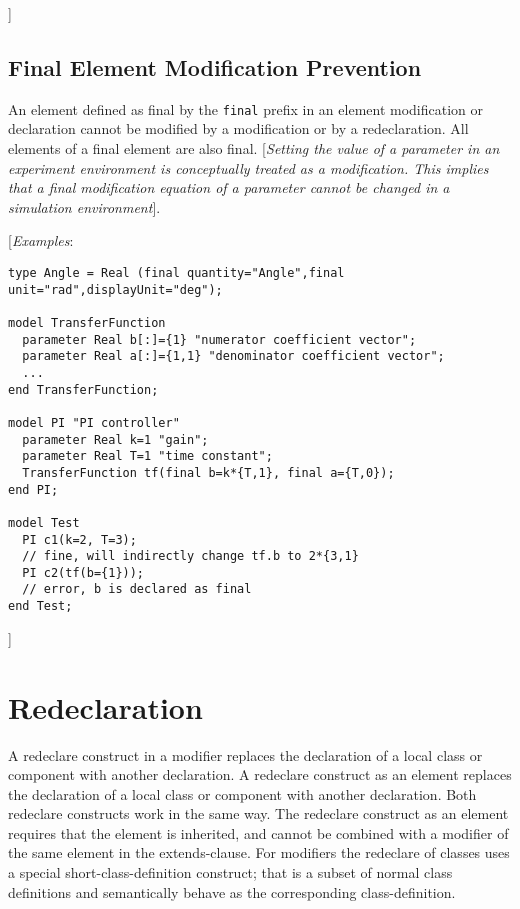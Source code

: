 {]}

\subsection{Final Element Modification Prevention}

An element defined as final by the \lstinline!final! prefix in an element
modification or declaration cannot be modified by a modification or by a
redeclaration. All elements of a final element are also final.
{[}\emph{Setting the value of a parameter in an experiment environment
is conceptually treated as a modification. This implies that a final
modification equation of a parameter cannot be changed in a simulation
environment}{]}.

{[}\emph{Examples}:
\begin{lstlisting}[language=modelica]
type Angle = Real (final quantity="Angle",final unit="rad",displayUnit="deg");

model TransferFunction
  parameter Real b[:]={1} "numerator coefficient vector";
  parameter Real a[:]={1,1} "denominator coefficient vector";
  ...
end TransferFunction;

model PI "PI controller"
  parameter Real k=1 "gain";
  parameter Real T=1 "time constant";
  TransferFunction tf(final b=k*{T,1}, final a={T,0});
end PI;

model Test
  PI c1(k=2, T=3);
  // fine, will indirectly change tf.b to 2*{3,1}
  PI c2(tf(b={1}));
  // error, b is declared as final
end Test;
\end{lstlisting}
{]}

\section{Redeclaration}

A redeclare construct in a modifier replaces the declaration of a local
class or component with another declaration. A redeclare construct as an
element replaces the declaration of a local class or component with
another declaration. Both redeclare constructs work in the same way. The
redeclare construct as an element requires that the element is
inherited, and cannot be combined with a modifier of the same element in
the extends-clause. For modifiers the redeclare of classes uses a
special short-class-definition construct; that is a subset of normal
class definitions and semantically behave as the corresponding
class-definition.

